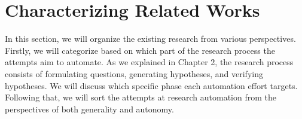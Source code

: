 \documentclass{article}
\begin{document}

\section{Characterizing Related Works}
In this section, we will organize the existing research from various perspectives. Firstly, we will categorize based on which part of the research process the attempts aim to automate. As we explained in Chapter 2, the research process consists of formulating questions, generating hypotheses, and verifying hypotheses. We will discuss which specific phase each automation effort targets. Following that, we will sort the attempts at research automation from the perspectives of both generality and autonomy.


\end{document}
